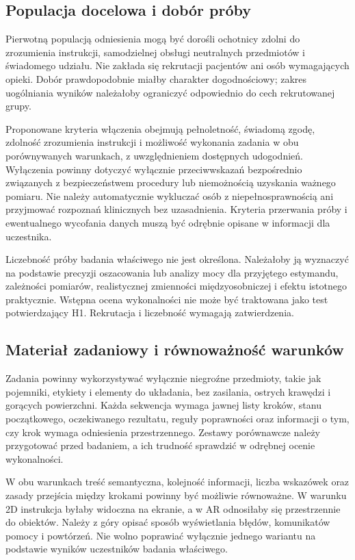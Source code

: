 \documentclass[11pt,a4paper]{article}
\begin{document}
\subsection{Populacja docelowa i dobór próby}
Pierwotną populacją odniesienia mogą być dorośli ochotnicy zdolni do zrozumienia instrukcji, samodzielnej obsługi neutralnych przedmiotów i świadomego udziału. Nie zakłada się rekrutacji pacjentów ani osób wymagających opieki. Dobór prawdopodobnie miałby charakter dogodnościowy; zakres uogólniania wyników należałoby ograniczyć odpowiednio do cech rekrutowanej grupy.

Proponowane kryteria włączenia obejmują pełnoletność, świadomą zgodę, zdolność zrozumienia instrukcji i możliwość wykonania zadania w obu porównywanych warunkach, z uwzględnieniem dostępnych udogodnień. Wyłączenia powinny dotyczyć wyłącznie przeciwwskazań bezpośrednio związanych z bezpieczeństwem procedury lub niemożnością uzyskania ważnego pomiaru. Nie należy automatycznie wykluczać osób z niepełnosprawnością ani przyjmować rozpoznań klinicznych bez uzasadnienia. Kryteria przerwania próby i ewentualnego wycofania danych muszą być odrębnie opisane w informacji dla uczestnika.

Liczebność próby badania właściwego nie jest określona. Należałoby ją wyznaczyć na podstawie precyzji oszacowania lub analizy mocy dla przyjętego estymandu, zależności pomiarów, realistycznej zmienności międzyosobniczej i efektu istotnego praktycznie. Wstępna ocena wykonalności nie może być traktowana jako test potwierdzający H1. Rekrutacja i liczebność wymagają zatwierdzenia.

\subsection{Materiał zadaniowy i równoważność warunków}
Zadania powinny wykorzystywać wyłącznie niegroźne przedmioty, takie jak pojemniki, etykiety i elementy do układania, bez zasilania, ostrych krawędzi i gorących powierzchni. Każda sekwencja wymaga jawnej listy kroków, stanu początkowego, oczekiwanego rezultatu, reguły poprawności oraz informacji o tym, czy krok wymaga odniesienia przestrzennego. Zestawy porównawcze należy przygotować przed badaniem, a ich trudność sprawdzić w odrębnej ocenie wykonalności.

W obu warunkach treść semantyczna, kolejność informacji, liczba wskazówek oraz zasady przejścia między krokami powinny być możliwie równoważne. W warunku 2D instrukcja byłaby widoczna na ekranie, a w AR odnosiłaby się przestrzennie do obiektów. Należy z góry opisać sposób wyświetlania błędów, komunikatów pomocy i powtórzeń. Nie wolno poprawiać wyłącznie jednego wariantu na podstawie wyników uczestników badania właściwego.
\end{document}

